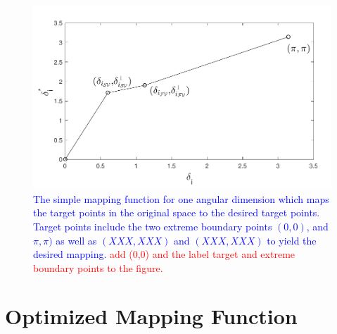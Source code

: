 \begin{figure}[t]
\centering
\includegraphics[scale=0.7]{Fig/simple_spline1.pdf}
\caption{\textcolor{blue}{The simple mapping function for one angular dimension which maps the target points in the original space to the desired target points. Target points include the two extreme boundary points $(0,0)$, and $\pi,\pi)$ as well as $(XXX,XXX)$ and $(XXX,XXX)$ to yield the desired mapping.} \textcolor{red}{add (0,0) and the label target and extreme boundary points to the figure.}}
\label{fig:simple_spline}
\end{figure}

\section{Optimized Mapping Function}

